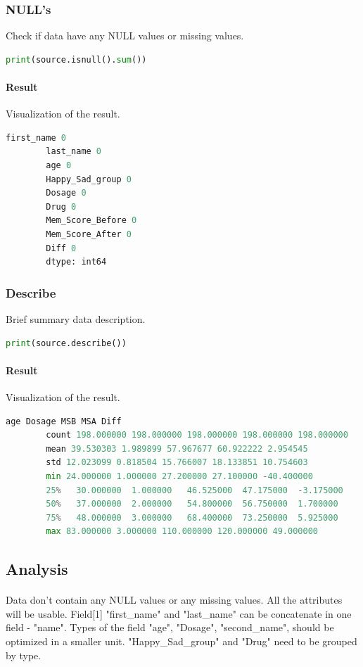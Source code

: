 \documentclass{article}
\begin{document}
    \subsubsection{NULL's} Check if data have any NULL values or missing values.
    \begin{lstlisting}[language=Python]
        print(source.isnull().sum())
    \end{lstlisting}
    \paragraph{Result} Visualization of the result.
    \begin{lstlisting}[language=Python]
        first_name 0
        last_name 0
        age 0
        Happy_Sad_group 0
        Dosage 0
        Drug 0
        Mem_Score_Before 0
        Mem_Score_After 0
        Diff 0
        dtype: int64
    \end{lstlisting}
    \subsubsection{Describe} Brief summary data description.
    \begin{lstlisting}[language=Python]
        print(source.describe())
    \end{lstlisting}
    \paragraph{Result} Visualization of the result.
    \begin{lstlisting}[language=Python]
        age Dosage MSB MSA Diff
        count 198.000000 198.000000 198.000000 198.000000 198.000000
        mean 39.530303 1.989899 57.967677 60.922222 2.954545
        std 12.023099 0.818504 15.766007 18.133851 10.754603
        min 24.000000 1.000000 27.200000 27.100000 -40.400000
        25%   30.000000  1.000000   46.525000  47.175000  -3.175000
        50%   37.000000  2.000000   54.800000  56.750000  1.700000
        75%   48.000000  3.000000   68.400000  73.250000  5.925000
        max 83.000000 3.000000 110.000000 120.000000 49.000000
    \end{lstlisting}
    \subsection{Analysis}
    \paragraph{}
    Data don't contain any NULL values or any missing values.
    All the attributes will be usable.
    Field[1] "first\_name" and "last\_name" can be concatenate in one field - "name".
    Types of the field "age", "Dosage", "second\_name", should be optimized in a smaller unit.
    "Happy\_Sad\_group" and "Drug" need to be grouped by type.
    \newpage
\end{document}
